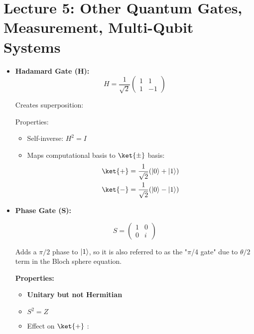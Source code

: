 \section{Lecture 5: Other Quantum Gates, Measurement, Multi-Qubit Systems}

\begin{itemize}
  \item \textbf{Hadamard Gate (H):}
    \[
      \boxed{
        H = \frac{1}{\sqrt{2}} \begin{pmatrix} 1 & 1 \\ 1 & -1 \end{pmatrix}
      }
    \]

    Creates superposition: 

    \vspace{0.3cm}

    Properties:

    \begin{itemize}
      \item Self-inverse: $H^2 = I$
      \item Maps computational basis to $\ket{\pm}$ basis:
        \begin{align*}
          \ket{+} &= \frac{1}{\sqrt{2}}(\zero + \one) \\
          \ket{-} &= \frac{1}{\sqrt{2}}(\zero - \one)
        \end{align*}
    \end{itemize}

    \nt{
      \[
        H \zero = \ket{+}, \quad H \one = \ket{-}, \quad H \ket{+} = \zero, \quad H \ket{-} = \one
      \]
    }

  \item \textbf{Phase Gate (S):}

    \[
      \boxed{
        S = \begin{pmatrix} 1 & 0 \\ 0 & i \end{pmatrix}
      }
    \]

    Adds a $\pi/2$ phase to $\left|1\right\rangle$, so it is also referred to as the "$\pi$/4 gate"
    due to $\theta/2$ term in the Bloch sphere equation.

    \vspace{0.3cm}

    \textbf{Properties:}

    \begin{itemize}
      \item \textbf{Unitary but not Hermitian}
      \item $S^2 = Z$
      \item Effect on $\ket{+}$ : 
    \end{itemize}


\end{itemize}

